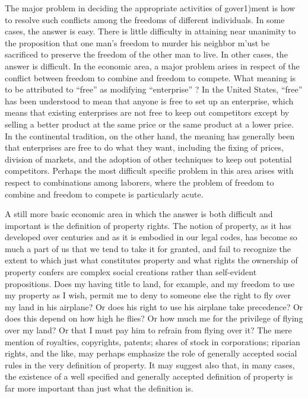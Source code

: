\documentclass[11pt,openany]{book}
\begin{document}
The major problem in deciding the appropriate activities of gover1)ment is how to resolve such conflicts among the freedoms of different individuals. In some cases, the answer is easy. There is little difficulty in attaining near unanimity to the proposition that one man's freedom to murder his neighbor m'ust be sacrificed to preserve the freedom of the other man to live. In other cases, the answer is difficult. In the economic area, a major problem arises in respect of the conflict between freedom to combine and freedom to compete. What meaning is to be attributed to ``free'' as modifying ``enterprise'' ? In the United States, ``free'' has been understood to mean that anyone is free to set up an enterprise, which means that existing enterprises are not free to keep out competitors except by selling a better product at the same price or the same product at a lower price. In the continental tradition, on the other hand, the meaning has generally been that enterprises are free to do what they want, including the fixing of prices, division of markets, and the adoption of other techniques to keep out potential competitors. Perhaps the most difficult specific problem in this area arises with respect to combinations among laborers, where the problem of freedom to combine and freedom to compete is particularly acute.

A still more basic economic area in which the answer is both difficult and important is the definition of property rights. The notion of property, as it has developed over centuries and as it is embodied in our legal codes, has become so much a part of us that we tend to take it for granted, and fail to recognize the extent to which just what constitutes property and what rights the ownership of property confers are complex social creations rather than self-evident propositions. Does my having title to land, for example, and my freedom to use my property as I wish, permit me to deny to someone else the right to fly over my land in his airplane? Or does his right to use his airplane take precedence? Or does this depend on how high he flies? Or how much me for the privilege of flying over my land? Or that I must pay him to refrain from flying over it? The mere mention of royalties, copyrights, patents; shares of stock in corporations; riparian rights, and the like, may perhaps emphasize the role of generally accepted social rules in the very definition of property. It may suggest also that, in many cases, the existence of a well specified and generally accepted definition of property is far more important than just what the definition is.
\end{document}
